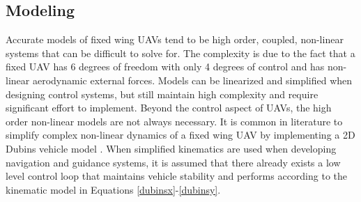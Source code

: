 \documentclass[numbered,pdftex]{ohio-etd}
\begin{document}
\subsection{Modeling}
%

Accurate models of fixed wing UAVs tend to be high order, coupled, non-linear systems that can be difficult to solve for. The complexity is due to the fact that a fixed UAV has 6 degrees of freedom with only 4 degrees of control and has non-linear aerodynamic external forces. Models can be linearized and simplified when designing control systems, but still maintain high complexity and require significant effort to implement. Beyond the control aspect of UAVs, the high order non-linear models are not always necessary. It is common in literature to simplify complex non-linear dynamics of a fixed wing UAV by implementing a 2D Dubins vehicle model \cite{chen_tracking_2009} \cite{liang_tangent_2017} \cite{nelson_cooperative_2005} \cite{griffiths_vector_2006} \cite{jung_unmanned_2016}. When simplified kinematics are used when developing navigation and guidance systems, it is assumed that there already exists a low level control loop that maintains vehicle stability and performs according to the kinematic model in Equations \ref{dubinsx}-\ref{dubinsy}.
\end{document}
